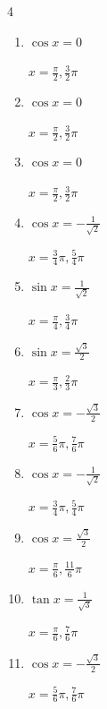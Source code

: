 \begin{multicols}{4}
\begin{enumerate}
  \item $\displaystyle \cos{x}  = 0$

        $\displaystyle x = \frac{\pi}{2} , \frac{3}{2}\pi$

  \item $\displaystyle \cos{x}  = 0$

        $\displaystyle x = \frac{\pi}{2} , \frac{3}{2}\pi$

  \item $\displaystyle \cos{x}  = 0$

        $\displaystyle x = \frac{\pi}{2} , \frac{3}{2}\pi$

  \item $\displaystyle \cos{x}  = -\frac{1}{\sqrt{2}}$

        $\displaystyle x = \frac{3}{4}\pi , \frac{5}{4}\pi$

  \item $\displaystyle \sin{x}  = \frac{1}{\sqrt{2}}$

        $\displaystyle x = \frac{\pi}{4} , \frac{3}{4}\pi$

  \item $\displaystyle \sin{x}  = \frac{\sqrt{3}}{2}$

        $\displaystyle x = \frac{\pi}{3} , \frac{2}{3}\pi$

  \item $\displaystyle \cos{x}  = -\frac{\sqrt{3}}{2}$

        $\displaystyle x = \frac{5}{6}\pi , \frac{7}{6}\pi$

  \item $\displaystyle \cos{x}  = -\frac{1}{\sqrt{2}}$

        $\displaystyle x = \frac{3}{4}\pi , \frac{5}{4}\pi$

\columnbreak %

\resetques

  \item $\displaystyle \cos{x}  = \frac{\sqrt{3}}{2}$

        $\displaystyle x = \frac{\pi}{6} , \frac{11}{6}\pi$

  \item $\displaystyle \tan{x}  = \frac{1}{\sqrt{3}}$

        $\displaystyle x = \frac{\pi}{6} , \frac{7}{6}\pi$

  \item $\displaystyle \cos{x}  = -\frac{\sqrt{3}}{2}$

        $\displaystyle x = \frac{5}{6}\pi , \frac{7}{6}\pi$


\end{enumerate}
\end{multicols}
